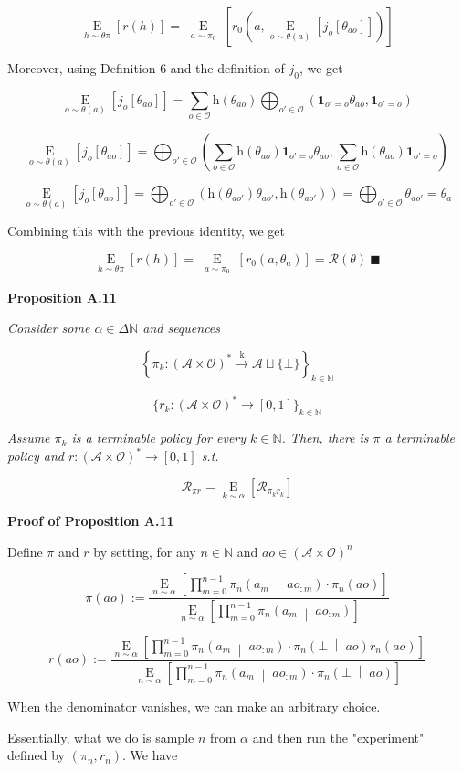 \documentclass[a4paper]{article}
\newcommand{\Co}[1]{}
\newcommand{\AP}[1]{\left(#1\right)}
\newcommand{\AB}[1]{\left[#1\right]}
\newcommand{\AC}[1]{\left\{#1\right\}}
\newcommand{\APM}[2]{\left(#1\;\middle\vert\;#2\right)}
\newcommand{\Ea}[2]{\underset{#1}{\operatorname{E}}\AB{#2}}
\newcommand{\Nats}{\mathbb{N}}
\newcommand{\K}{\xrightarrow{\mathrm{k}}}
\newcommand{\KD}[1]{\boldsymbol{1}_{#1}}
\newcommand{\A}{\mathcal{A}}
\newcommand{\AX}{\A\sqcup\{\bot\}}
\newcommand{\Ob}{\mathcal{O}}
\newcommand{\AO}{\AP{\A\times\Ob}}
\newcommand{\FH}{\AO^*}
\newcommand{\R}{\mathcal{R}}
\newcommand{\Ht}{\mathrm{h}}
\begin{document}
$$\Ea{h\sim\theta\pi}{r(h)}=\Ea{\substack{a\sim\pi_0}}{r_0\AP{a,\Ea{o\sim\theta(a)}{j_o\AB{\theta_{ao}}}}}$$

Moreover, using Definition 6 and the definition of $j_0$, we get

$$\Ea{o\sim\theta(a)}{j_o\AB{\theta_{ao}}}=\sum_{o\in\Ob}\Ht\AP{\theta_{ao}}\bigoplus_{o'\in\Ob}\AP{\KD{o'=o}\theta_{ao},\KD{o'=o}}$$

$$\Ea{o\sim\theta(a)}{j_o\AB{\theta_{ao}}}=\bigoplus_{o'\in\Ob}\AP{\sum_{o\in\Ob}\Ht\AP{\theta_{ao}}\KD{o'=o}\theta_{ao},\sum_{o\in\Ob}\Ht\AP{\theta_{ao}}\KD{o'=o}}$$

$$\Ea{o\sim\theta(a)}{j_o\AB{\theta_{ao}}}=\bigoplus_{o'\in\Ob}\AP{\Ht\AP{\theta_{ao'}}\theta_{ao'},\Ht\AP{\theta_{ao'}}}=\bigoplus_{o'\in\Ob}\theta_{ao'}=\theta_a$$

Combining this with the previous identity, we get

$$\Ea{h\sim\theta\pi}{r(h)}=\Ea{\substack{a\sim\pi_0}}{r_0\AP{a,\theta_a}}=\R(\theta)\ \blacksquare$$

\textbf{Proposition A.11}\Co{b}

\textit{Consider some $\alpha\in\Delta\Nats$ and sequences }\Co{i}

$$\AC{\pi_k:\FH\K\AX}_{k\in\Nats}$$ 

$$\bigg\{r_k:\FH\rightarrow[0,1]\bigg\}_{k\in\Nats}$$

\textit{Assume $\pi_k$ is a terminable policy for every $k\in\Nats$. Then, there is $\pi$ a terminable policy and $r:\FH\rightarrow[0,1]$ s.t.}\Co{i}

$$\R_{\pi r}=\Ea{k\sim\alpha}{\R_{\pi_k r_k}}$$

\textbf{Proof of Proposition A.11}\Co{b}

Define $\pi$ and $r$ by setting, for any $n\in\Nats$ and $ao\in\AO^n$

$$\pi(ao):=\frac{\Ea{n\sim\alpha}{\prod_{m=0}^{n-1}\pi_n\APM{a_m}{ao_{:m}}\cdot\pi_n\AP{ao}}}{\Ea{n\sim\alpha}{\prod_{m=0}^{n-1}\pi_n\APM{a_m}{ao_{:m}}}}$$

$$r(ao):=\frac{\Ea{n\sim\alpha}{\prod_{m=0}^{n-1}\pi_n\APM{a_m}{ao_{:m}}\cdot \pi_n\APM{\bot}{ao}r_n\AP{ao}}}{\Ea{n\sim\alpha}{\prod_{m=0}^{n-1}\pi_n\APM{a_m}{ao_{:m}}\cdot\pi_n\APM{\bot}{ao}}}$$

When the denominator vanishes, we can make an arbitrary choice.

Essentially, what we do is sample $n$ from $\alpha$ and then run the "experiment" defined by $\AP{\pi_n,r_n}$. We have
\end{document}
